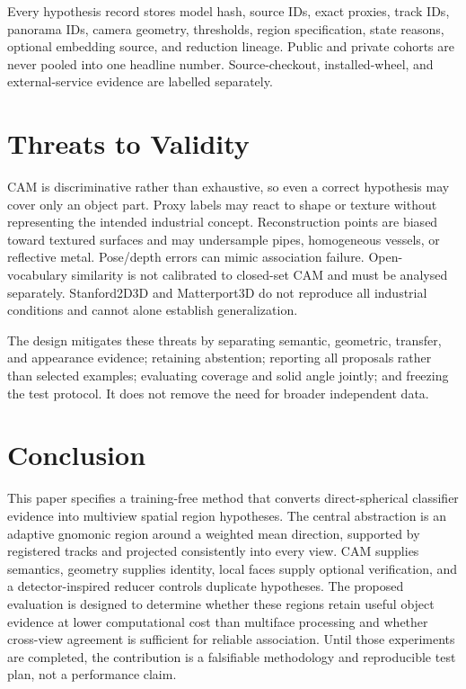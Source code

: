 \documentclass[a4paper,9pt]{extarticle}
\begin{document}
Every hypothesis record stores model hash, source IDs, exact proxies, track IDs, panorama IDs, camera geometry, thresholds, region specification, state reasons, optional embedding source, and reduction lineage. Public and private cohorts are never pooled into one headline number. Source-checkout, installed-wheel, and external-service evidence are labelled separately.

\section{Threats to Validity}

CAM is discriminative rather than exhaustive, so even a correct hypothesis may cover only an object part. Proxy labels may react to shape or texture without representing the intended industrial concept. Reconstruction points are biased toward textured surfaces and may undersample pipes, homogeneous vessels, or reflective metal. Pose/depth errors can mimic association failure. Open-vocabulary similarity is not calibrated to closed-set CAM and must be analysed separately. Stanford2D3D and Matterport3D do not reproduce all industrial conditions and cannot alone establish generalization.

The design mitigates these threats by separating semantic, geometric, transfer, and appearance evidence; retaining abstention; reporting all proposals rather than selected examples; evaluating coverage and solid angle jointly; and freezing the test protocol. It does not remove the need for broader independent data.

\section{Conclusion}

This paper specifies a training-free method that converts direct-spherical classifier evidence into multiview spatial region hypotheses. The central abstraction is an adaptive gnomonic region around a weighted mean direction, supported by registered tracks and projected consistently into every view. CAM supplies semantics, geometry supplies identity, local faces supply optional verification, and a detector-inspired reducer controls duplicate hypotheses. The proposed evaluation is designed to determine whether these regions retain useful object evidence at lower computational cost than multiface processing and whether cross-view agreement is sufficient for reliable association. Until those experiments are completed, the contribution is a falsifiable methodology and reproducible test plan, not a performance claim.
\end{document}
